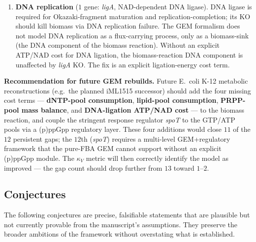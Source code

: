 \documentclass[11pt,a4paper]{article}
\theoremstyle{plain}
\theoremstyle{definition}
\theoremstyle{remark}
\begin{document}
\begin{enumerate}
\item \textbf{DNA replication} ($1$ gene: \emph{ligA}, NAD-dependent
DNA ligase). DNA ligase is required for Okazaki-fragment maturation
and replication-completion; its KO should kill biomass via DNA
replication failure. The GEM formalism does not model DNA replication
as a flux-carrying process, only as a biomass-sink (the DNA
component of the biomass reaction). Without an explicit ATP/NAD
cost for DNA ligation, the biomass-reaction DNA component is
unaffected by \emph{ligA} KO. The fix is an explicit ligation-energy
cost term.
\end{enumerate}

\textbf{Recommendation for future GEM rebuilds.} Future
E.~coli K-12 metabolic reconstructions (e.g.~the planned
iML1515 successor) should add the four missing cost terms ---
\textbf{dNTP-pool consumption}, \textbf{lipid-pool consumption},
\textbf{PRPP-pool mass balance}, and \textbf{DNA-ligation ATP/NAD
cost} --- to the biomass reaction, and couple the stringent response
regulator \emph{spoT} to the GTP/ATP pools via a (p)ppGpp regulatory
layer. These four additions would close $11$ of the $12$ persistent
gaps; the $12$th (\emph{spoT}) requires a multi-level
GEM+regulatory framework that the pure-FBA GEM cannot support
without an explicit (p)ppGpp module. The $\kappa_V$ metric will
then correctly identify the model as improved --- the gap count
should drop further from $13$ toward $1$--$2$.


\subsection{Conjectures}

The following conjectures are precise, falsifiable statements that are
plausible but not currently provable from the manuscript's assumptions.
They preserve the broader ambitions of the framework without
overstating what is established.
\end{document}
